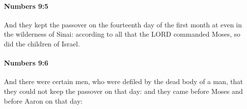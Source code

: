 		\paragraph{Numbers 9:5} %
			\label{NUMBERS-9-5}

			And they kept the passover on the fourteenth day of the first month at even in the wilderness of Sinai: according to all that the LORD commanded Moses, so did the children of Israel.


		\paragraph{Numbers 9:6} %
			\label{NUMBERS-9-6}

			And there were certain men, who were defiled by the dead body of a man, that they could not keep the passover on that day: and they came before Moses and before Aaron on that day:


